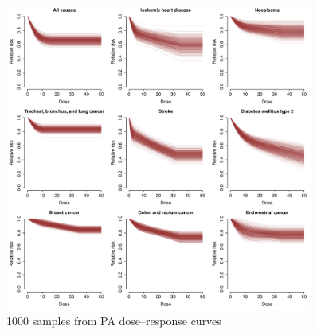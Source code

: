 \documentclass{article}
\begin{document}
\begin{appendix}
\begin{figure}[H]
\centering
\includegraphics[width=0.9\textwidth]{PA_dose_response.pdf}
\caption{\small 1000 samples from PA dose--response curves}
\label{PADR}
\end{figure}


\end{appendix}
\end{document}
